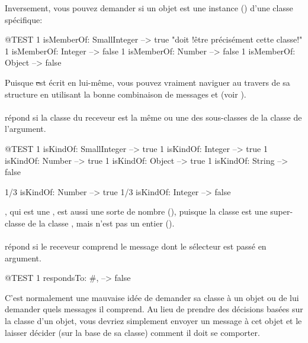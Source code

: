 \documentclass[a4paper,10pt,twoside]{book}
\begin{document}
Inversement, vous pouvez demander si un objet est une instance 
()
d'une classe spécifique:
\begin{code}{@TEST}
1 isMemberOf: SmallInteger --> true    "doit !être précisément cette classe!"
1 isMemberOf: Integer      --> false
1 isMemberOf: Number       --> false
1 isMemberOf: Object       --> false
\end{code}

Puisque \st est écrit en lui-même, vous pouvez vraiment naviguer au travers de sa structure en utilisant la bonne combinaison de messages  et  (voir ). 

\paragraph{}
 répond  si la classe du receveur est la même ou une des sous-classes de la classe de l'argument.

\begin{code}{@TEST}
1 isKindOf: SmallInteger --> true
1 isKindOf: Integer          --> true
1 isKindOf: Number         --> true
1 isKindOf: Object           --> true
1 isKindOf: String            --> false

1/3 isKindOf: Number      --> true
1/3 isKindOf: Integer        --> false
\end{code}

, qui est une , est aussi une sorte de nombre (), puisque la classe  est une super-classe de la classe , mais  n'est pas un entier ().

\paragraph{}
 répond  si le receveur comprend le message dont le sélecteur est passé en argument.

\begin{code}{@TEST}
1 respondsTo: #, --> false
\end{code}

C'est normalement une mauvaise idée de demander sa classe à un
objet ou de lui demander quels messages il comprend.
Au lieu de prendre des décisions basées sur la classe d'un objet, 
vous devriez simplement envoyer un message à cet objet et le laisser 
décider (\ie sur la base de sa classe) comment il doit se comporter.
\end{document}
